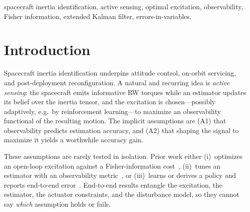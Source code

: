 \documentclass[conference]{IEEEtran}
\begin{document}
\begin{IEEEkeywords}
spacecraft inertia identification, active sensing, optimal excitation, observability, Fisher information, extended Kalman filter, errors-in-variables.
\end{IEEEkeywords}

\section{Introduction}
Spacecraft inertia identification underpins attitude control, on-orbit servicing, and post-deployment reconfiguration. A natural and recurring idea is \emph{active sensing}: the spacecraft emits informative RW torques while an estimator updates its belief over the inertia tensor, and the excitation is chosen---possibly adaptively, e.g.\ by reinforcement learning---to maximize an observability functional of the resulting motion. The implicit assumptions are (A1) that observability predicts estimation accuracy, and (A2) that shaping the signal to maximize it yields a worthwhile accuracy gain.

These assumptions are rarely tested in isolation. Prior work either (i)~optimizes an open-loop excitation against a Fisher-information cost~\cite{zhai2017optimal,calafiore2001robot,swevers1997optimal}, (ii)~tunes an estimator with an observability metric~\cite{evain2024improving}, or (iii)~learns or derives a policy and reports end-to-end error~\cite{enders2021deep,elhariry2025towards}. End-to-end results entangle the excitation, the estimator, the actuator constraints, and the disturbance model, so they cannot say \emph{which} assumption holds or fails.
\end{document}
